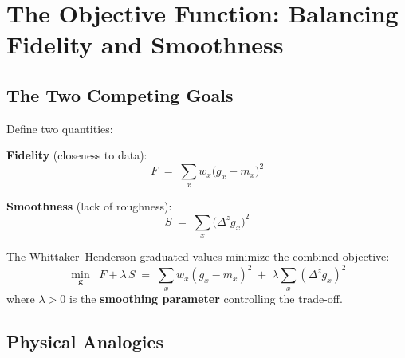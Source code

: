 \documentclass[11pt,a4paper]{article}
\begin{document}
\section{The Objective Function: Balancing Fidelity and Smoothness}

\subsection{The Two Competing Goals}

\begin{formaldef}
Define two quantities:

\textbf{Fidelity} (closeness to data):
\[
  F \;=\; \sum_{x} w_x \bigl(g_x - m_x\bigr)^2
\]

\textbf{Smoothness} (lack of roughness):
\[
  S \;=\; \sum_{x} \bigl(\Delta^z g_x\bigr)^2
\]

The Whittaker--Henderson graduated values minimize the combined objective:
\[
  \boxed{\min_{\bm{g}} \;\; F + \lambda\, S
  \;=\; \sum_{x} w_x (g_x - m_x)^2 \;+\; \lambda \sum_{x} (\Delta^z g_x)^2}
\]
where $\lambda > 0$ is the \textbf{smoothing parameter} controlling the trade-off.
\end{formaldef}

\subsection{Physical Analogies}
\end{document}
